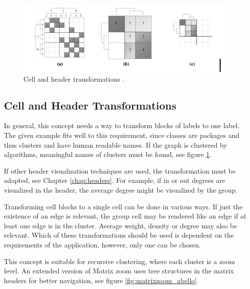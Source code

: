\begin{figure}[h]
\centering
\includegraphics{images/matrixzoom_transform}
\caption{Cell and header transformations \citep{ham-ivis-2003}. \label{fig:matrixzoom_transform}}
\end{figure}




\subsection{Cell and Header Transformations}   
In general, this concept needs a way to transform blocks of labels to one label. The given example fits well to this requirement, since classes are packages and thus clusters and have human readable names. If the graph is clustered by algorithms, meaningful names of clusters must be found, see figure \ref{fig:matrixzoom_transform}.

If other header visualization techniques are used, the transformation must be adapted, see Chapter \ref{chap:headers}. For example, if in or out degrees are visualized in the header, the average degree might be visualized by the group.

Transforming cell blocks to a single cell can be done in various ways. If just the existence of an edge is relevant, the group cell may be rendered like an edge if at least one edge is in the cluster. Average weight, density or degree may also be relevant. Which of these transformations should be used is dependent on the requirements of the application, however, only one can be chosen.

This concept is suitable for recursive clustering, where each cluster is a zoom level. An extended version of Matrix zoom  \citep{abello2004} uses tree structures in the matrix headers for better navigation, see figure \ref{fig:matrixzoom_abello}.

